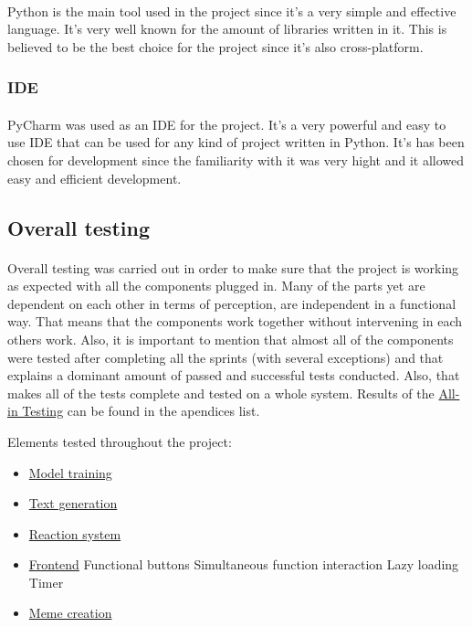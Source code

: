 \documentclass[12pt]{report}
\begin{document}
\paragraph{}
Python is the main tool used in the project since it's a very simple and effective language. It's very well known for
the amount of libraries written in it. This is believed to be the best choice for the project since it's also cross-platform.

\subsubsection*{IDE}
\paragraph{}
PyCharm was used as an IDE for the project. It's a very powerful and easy to use IDE that can be used for any kind of project
written in Python. It's has been chosen for development since the familiarity with it was very hight and it allowed
easy and efficient development.

\subsection*{Overall testing}
\paragraph{}
Overall testing was carried out in order to make sure that the project is working as expected with all the components plugged in.
Many of the parts yet are dependent on each other in terms of perception, are independent in a functional way. That means that 
the components work together without intervening in each others work. Also, it is important to mention that almost all of the components
were tested after completing all the sprints (with several exceptions) and that explains a dominant amount of passed and successful tests
conducted. Also, that makes all of the tests complete and tested on a whole system. Results of the \hyperref[appendix:all-in_testing]{All-in Testing}
can be found in the apendices list.

Elements tested throughout the project:
\begin{itemize}
  \item \hyperref[sec:model_testing]{Model training}
  \item \hyperref[appendix:model_testing]{Text generation}
  \item \hyperref[appendix:reaction_system_testing]{Reaction system}
  \item \hyperref[appendix:frontend_testing]{Frontend}
  \subitem Functional buttons
  \subitem Simultaneous function interaction
  \subitem Lazy loading
  \subitem Timer
  \item \hyperref[appendix:meme_creation_testing]{Meme creation}
\end{itemize}
\end{document}
